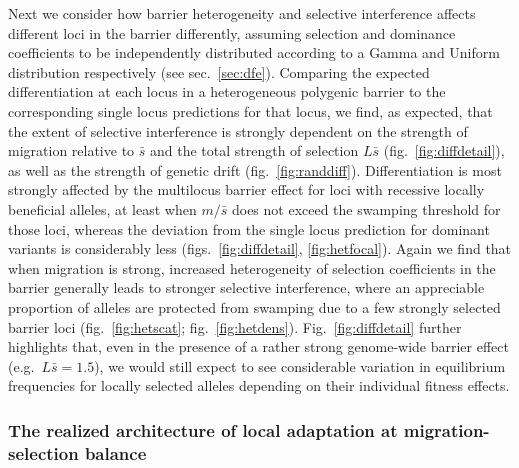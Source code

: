 \documentclass[
  11pt,
]{article}
\begin{document}
Next we consider how barrier heterogeneity and selective interference
affects different loci in the barrier differently, assuming selection
and dominance coefficients to be independently distributed according to
a Gamma and Uniform distribution respectively (see sec.~\ref{sec:dfe}).
Comparing the expected differentiation at each locus in a heterogeneous
polygenic barrier to the corresponding single locus predictions for that
locus, we find, as expected, that the extent of selective interference
is strongly dependent on the strength of migration relative to
\(\bar{s}\) and the total strength of selection \(L\bar{s}\)
(fig.~\ref{fig:diffdetail}), as well as the strength of genetic drift
(fig.~\ref{fig:randdiff}). Differentiation is most strongly affected by
the multilocus barrier effect for loci with recessive locally beneficial
alleles, at least when \(m/\bar{s}\) does not exceed the swamping
threshold for those loci, whereas the deviation from the single locus
prediction for dominant variants is considerably less
(figs.~\ref{fig:diffdetail}, \ref{fig:hetfocal}). Again we find that
when migration is strong, increased heterogeneity of selection
coefficients in the barrier generally leads to stronger selective
interference, where an appreciable proportion of alleles are protected
from swamping due to a few strongly selected barrier loci
(fig.~\ref{fig:hetscat}; fig.~\ref{fig:hetdens}).
Fig.~\ref{fig:diffdetail} further highlights that, even in the presence
of a rather strong genome-wide barrier effect (e.g.~\(L\bar{s}=1.5\)),
we would still expect to see considerable variation in equilibrium
frequencies for locally selected alleles depending on their individual
fitness effects.

\hypertarget{the-realized-architecture-of-local-adaptation-at-migration-selection-balance}{%
\subsubsection{The realized architecture of local adaptation at
migration-selection
balance}\label{the-realized-architecture-of-local-adaptation-at-migration-selection-balance}}
\end{document}
